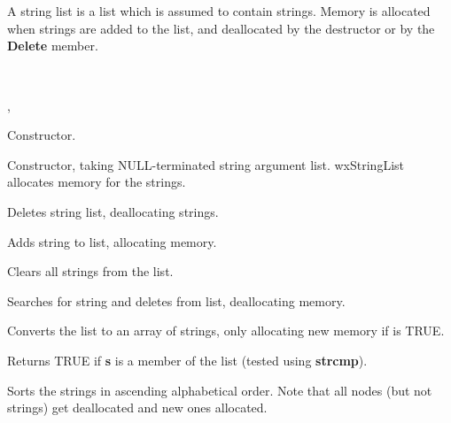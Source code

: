 \section{}\label{wxstringlist}

A string list is a list which is assumed to contain strings.
Memory is allocated when strings are added to
the list, and deallocated by the destructor or by the {\bf Delete}\rtfsp
member.


\\


, 




Constructor.


Constructor, taking NULL-terminated string argument list. wxStringList
allocates memory for the strings.



Deletes string list, deallocating strings.



Adds string to list, allocating memory.



Clears all strings from the list.



Searches for string and deletes from list, deallocating memory.



Converts the list to an array of strings, only allocating new memory if
 is TRUE.



Returns TRUE if {\bf s} is a member of the list (tested using {\bf strcmp}).



Sorts the strings in ascending alphabetical order. Note that all nodes
(but not strings) get deallocated and new ones allocated.


